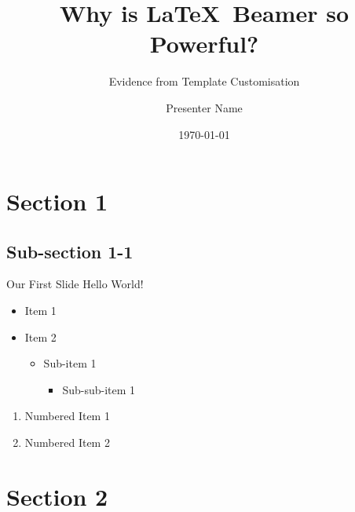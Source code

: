 \documentclass[aspectratio=149]{beamer}
\title[footer text]{Why is \LaTeX \ Beamer so Powerful?}
\subtitle{Evidence from Template Customisation}
\author{Presenter Name}
\institute{Department of Banking and Finance, Monash Business School}
\date{\today}
\begin{document}
{
\begin{frame}[noframenumbering]
  \titlepage
\end{frame}
}

{
\begin{frame}[t,noframenumbering]
  \centering\vspace{3ex}{\LARGE\textcolor{monashblue}{Agenda}}
  \tableofcontents
\end{frame}
}

\section{Section 1}

\subsection{Sub-section 1-1}

\begin{frame}{Our First Slide}
  Hello World!
  \vspace{\baselineskip}
  \vspace{\baselineskip}

  \begin{itemize}
    \item Item 1
    \item Item 2
          \begin{itemize}
            \item Sub-item 1
                  \begin{itemize}
                    \item Sub-sub-item 1
                  \end{itemize}
          \end{itemize}
  \end{itemize}

  \begin{enumerate}
    \item Numbered Item 1
    \item Numbered Item 2
  \end{enumerate}
\end{frame}

\section{Section 2}
\end{document}
